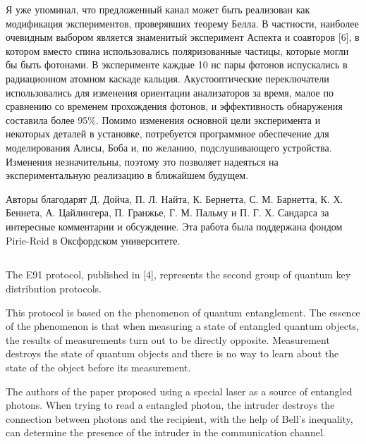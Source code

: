 Я уже упоминал, что предложенный канал может быть реализован как модификация экспериментов, проверявших теорему Белла. В частности, наиболее очевидным выбором является знаменитый эксперимент Аспекта и соавторов [6], в котором вместо спина использовались поляризованные частицы, которые могли бы быть фотонами. В эксперименте каждые 10 нс пары фотонов испускались в радиационном атомном каскаде кальция. Акустооптические переключатели использовались для изменения ориентации анализаторов за время, малое по сравнению со временем прохождения фотонов, и эффективность обнаружения составила более 95\%. Помимо изменения основной цели эксперимента и некоторых деталей в установке, потребуется программное обеспечение для моделирования Алисы, Боба и, по желанию, подслушивающего устройства. Изменения незначительны, поэтому это позволяет надеяться на экспериментальную реализацию в ближайшем будущем.

Авторы благодарят Д. Дойча, П. Л. Найта, К. Бернетта, С. М. Барнетта, К. Х. Беннета, А. Цайлингера, П. Гранжье, Г. М. Пальму и П. Г. Х. Сандарса за интересные комментарии и обсуждение. Эта работа была поддержана фондом Pirie-Reid в Оксфордском университете.


\subsection{\review}
The E91 protocol, published in [4], represents the second group of quantum key distribution protocols.

This protocol is based on the phenomenon of quantum entanglement. The essence of the phenomenon is that when measuring a state of entangled quantum objects, the results of measurements turn out to be directly opposite. Measurement destroys the state of quantum objects and there is no way to learn about the state of the object before its measurement.

The authors of the paper proposed using a special laser as a source of entangled photons. When trying to read a entangled photon, the intruder destroys the connection between photons and the recipient, with the help of Bell's inequality, can determine the presence of the intruder in the communication channel.


\subsection{\dic}

